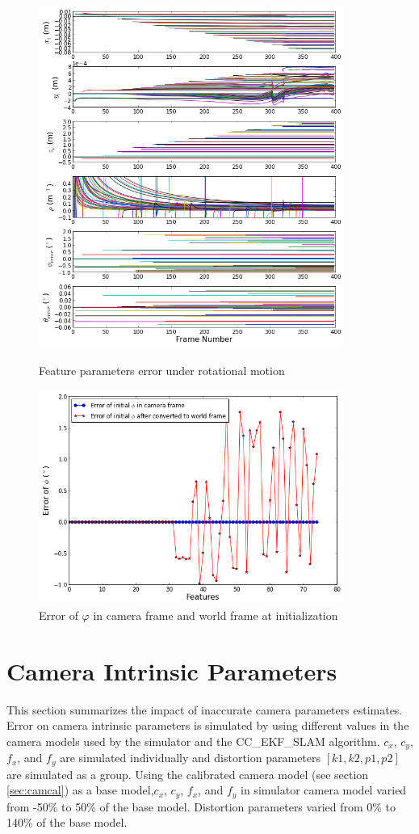 \begin{figure}[h]
  \centering
  \includegraphics[width=10cm, height=12cm]{./Figures/SimulationFigures/Figure25.png}
  \caption{Feature parameters error under rotational motion}
  \label{fig:simfig25}
\end{figure}

\begin{figure}[h] %
  \centering
  \includegraphics[width=10cm, height=7cm]{./Figures/SimulationFigures/Figure26.png}
  \caption{Error of $\varphi$ in camera frame and world frame at initialization}
  \label{fig:simfig26}
\end{figure}
\FloatBarrier

\section{Camera Intrinsic Parameters}
This section summarizes the impact of inaccurate camera parameters estimates. Error on camera intrinsic parameters is simulated by using different values in the camera models used by the simulator and the CC\_EKF\_SLAM algorithm. $c_{x}$, $c_{y}$, $f_{x}$, and $f_{y}$ are simulated individually and distortion parameters $[k1, k2, p1, p2]$ are simulated as a group. Using the calibrated camera model (see section \ref{sec:camcal}) as a base model,$ c_{x}$, $c_{y}$, $f_{x} $, and $f_{y}$ in simulator camera model varied from -50\% to 50\% of the base model. Distortion parameters varied from 0\% to 140\% of the base model.

